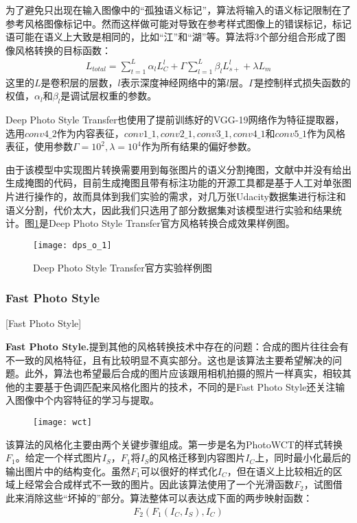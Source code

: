 为了避免只出现在输入图像中的“孤独语义标记”，算法将输入的语义标记限制在了参考风格图像标记中。然而这样做可能对导致在参考样式图像上的错误标记，标记语可能在语义上大致是相同的，比如“江”和“湖”等。算法将3个部分组合形成了图像风格转换的目标函数：
\begin{align}
    L_{total}=\sum_{t=1}^L\alpha_lL_C^l+\Gamma\sum_{l=1}^L \beta_lL_{s+}^l +\lambda L_m
\end{align}
这里的$L$是卷积层的层数，$l$表示深度神经网络中的第$l$层。$\Gamma$是控制样式损失函数的权值，$\alpha_l$和$\beta_l$是调试层权重的参数。

Deep Photo Style Transfer也使用了提前训练好的VGG-19\cite{vgg-19}网络作为特征提取器，选用$conv4\_2$作为内容表征，$conv1\_1,conv2\_1,conv3\_1,conv4\_1$和$conv5\_1$作为风格表征，使用参数$\Gamma=10^2,\lambda=10^4$作为所有结果的偏好参数。

由于该模型中实现图片转换需要用到每张图片的语义分割掩图，文献\cite{dpst}中并没有给出生成掩图的代码，目前生成掩图且带有标注功能的开源工具都是基于人工对单张图片进行操作的，故而具体到我们实验的需求，对几万张Udacity数据集进行标注和语义分割，代价太大，因此我们只选用了部分数据集对该模型进行实验和结果统计。图\ref{fig:dps}是Deep Photo Style Transfer官方风格转换合成效果样例图。

\begin{figure}[h]
    \centering
    \texttt{[image: dps\_o\_1]}
    \caption{Deep Photo Style Transfer官方实验样例图}
    \label{fig:dps}
\end{figure}


\subsubsection{Fast Photo Style}[Fast Photo Style]

\textbf{Fast Photo Style.}\cite{fps}\quad  提到其他的风格转换技术中存在的问题：合成的图片往往会有不一致的风格特征，且有比较明显不真实部分。这也是该算法主要希望解决的问题。此外，算法也希望最后合成的图片应该跟用相机拍摄的照片一样真实，相较其他的主要基于色调匹配来风格化图片的技术，不同的是Fast Photo Style还关注输入图像中个内容特征的学习与提取。

\begin{figure}[t]
    \centering
    \texttt{[image: wct]}
    \caption{}
    \label{wctf}
\end{figure}

该算法的风格化主要由两个关键步骤组成。第一步是名为PhotoWCT的样式转换$F_1$。给定一个样式图片$I_S$，$F_1$将$I_S$的风格迁移到内容图片$I_C$上，同时最小化最后的输出图片中的结构变化。虽然$F_1$可以很好的样式化$I_C$，但在语义上比较相近的区域上经常会合成样式不一致的图片。因此该算法使用了一个光滑函数$F_2$，试图借此来消除这些“坏掉的”部分。算法整体可以表达成下面的两步映射函数：
\begin{align}
    F_2(F_1(I_C,I_S),I_C)
\end{align}

